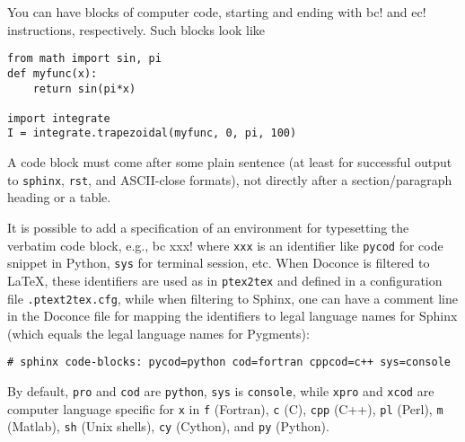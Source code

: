 \documentclass[twoside]{article}
\begin{document}
You can have blocks of computer code, starting and ending with
{\fontsize{10pt}{10pt}\verb!!bc!} and {\fontsize{10pt}{10pt}\verb!!ec!} instructions, respectively. Such blocks look like
\providecommand{\shadedskip}{}
\renewenvironment{shadedskip}{
\def\FrameCommand{\colorbox{shadecolor}}\FrameRule0.6pt
\MakeFramed {\FrameRestore}\vskip3mm}{\vskip0mm\endMakeFramed}
\providecommand{\shadedquoteBlue}{}
\renewenvironment{shadedquoteBlue}[1][]{
\bgroup\rmfamily
\fboxsep=0mm\relax
\begin{shadedskip}
\list{}{\parsep=-2mm\parskip=0mm\topsep=0pt\leftmargin=2mm
\rightmargin=2\leftmargin\leftmargin=4pt\relax}
\item\relax}
{\endlist\end{shadedskip}\egroup}\begin{shadedquoteBlue}
\fontsize{9pt}{9pt}
\begin{Verbatim}
from math import sin, pi
def myfunc(x):
    return sin(pi*x)

import integrate
I = integrate.trapezoidal(myfunc, 0, pi, 100)
\end{Verbatim}
\end{shadedquoteBlue}
\noindent
A code block must come after some plain sentence (at least for successful
output to {\fontsize{10pt}{10pt}\verb!sphinx!}, {\fontsize{10pt}{10pt}\verb!rst!}, and ASCII-close formats),
not directly after a section/paragraph heading or a table.

It is possible to add a specification of an
environment for typesetting the verbatim code block, e.g., {\fontsize{10pt}{10pt}\verb!!bc xxx!}
where {\fontsize{10pt}{10pt}\verb!xxx!} is an identifier like {\fontsize{10pt}{10pt}\verb!pycod!} for code snippet in Python,
{\fontsize{10pt}{10pt}\verb!sys!} for terminal session, etc. When Doconce is filtered to {\LaTeX},
these identifiers are used as in {\fontsize{10pt}{10pt}\verb!ptex2tex!} and defined in a
configuration file {\fontsize{10pt}{10pt}\verb!.ptext2tex.cfg!}, while when filtering
to Sphinx, one can have a comment line in the Doconce file for
mapping the identifiers to legal language names for Sphinx (which equals
the legal language names for Pygments):
\begin{Verbatim}[fontsize=\fontsize{9pt}{9pt},tabsize=8,baselinestretch=0.85,
fontfamily=tt,xleftmargin=7mm]
# sphinx code-blocks: pycod=python cod=fortran cppcod=c++ sys=console
\end{Verbatim}
\noindent
By default, {\fontsize{10pt}{10pt}\verb!pro!} and {\fontsize{10pt}{10pt}\verb!cod!} are {\fontsize{10pt}{10pt}\verb!python!}, {\fontsize{10pt}{10pt}\verb!sys!} is {\fontsize{10pt}{10pt}\verb!console!},
while {\fontsize{10pt}{10pt}\verb!xpro!} and {\fontsize{10pt}{10pt}\verb!xcod!} are computer language specific for {\fontsize{10pt}{10pt}\verb!x!}
in {\fontsize{10pt}{10pt}\verb!f!} (Fortran), {\fontsize{10pt}{10pt}\verb!c!} (C), {\fontsize{10pt}{10pt}\verb!cpp!} (C++), {\fontsize{10pt}{10pt}\verb!pl!} (Perl), {\fontsize{10pt}{10pt}\verb!m!} (Matlab),
{\fontsize{10pt}{10pt}\verb!sh!} (Unix shells), {\fontsize{10pt}{10pt}\verb!cy!} (Cython), and {\fontsize{10pt}{10pt}\verb!py!} (Python).
\end{document}
